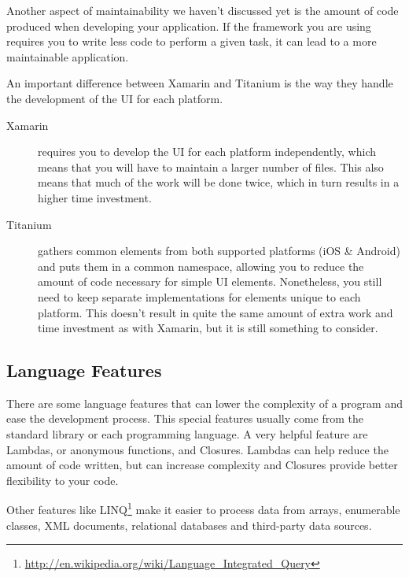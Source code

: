 Another aspect of maintainability we haven't discussed yet is the amount of code produced when developing your application. If the framework you are using requires you to write less code to perform a given task, it can lead to a more maintainable application.

An important difference between Xamarin and Titanium is the way they handle the development of the \ac{UI} for each platform.

\begin{description}
\item[Xamarin] requires you to develop the \ac{UI} for each platform independently, which means that you will have to maintain a larger number of files. This also means that much of the work will be done twice, which in turn results in a higher time investment.

\item[Titanium] gathers common elements from both supported platforms (iOS \& Android) and puts them in a common namespace, allowing you to reduce the amount of code necessary for simple \ac{UI} elements. Nonetheless, you still need to keep separate implementations for elements unique to each platform. This doesn't result in quite the same amount of extra work and time investment as with Xamarin, but it is still something to consider.
\end{description}
\vfill


\subsection{Language Features}

There are some language features that can lower the complexity of a program and ease the development process. This special features usually come from the standard library or each programming language. A very helpful feature are Lambdas, or anonymous functions, and Closures. Lambdas can help reduce the amount of code written, but can increase complexity and Closures provide better flexibility to your code.

Other features like \ac{LINQ}\footnote{\url{http://en.wikipedia.org/wiki/Language_Integrated_Query}} make it easier to process data from arrays, enumerable classes, XML documents, relational databases and third-party data sources. 

